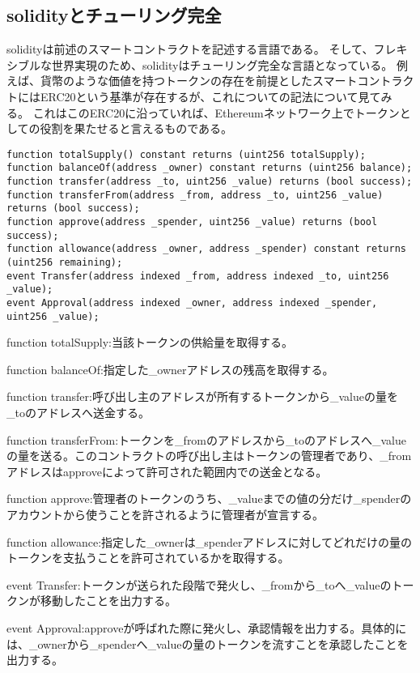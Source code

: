 \subsection{solidityとチューリング完全}
solidityは前述のスマートコントラクトを記述する言語である。
そして、フレキシブルな世界実現のため、solidityはチューリング完全な言語となっている。
例えば、貨幣のような価値を持つトークンの存在を前提としたスマートコントラクトにはERC20という基準が存在するが、これについての記法について見てみる。
これはこのERC20に沿っていれば、Ethereumネットワーク上でトークンとしての役割を果たせると言えるものである。
\begin{lstlisting}[caption=ERC20を満たすために必要な関数とイベントの宣言文,label=ERC20-criteria]
function totalSupply() constant returns (uint256 totalSupply);
function balanceOf(address _owner) constant returns (uint256 balance);
function transfer(address _to, uint256 _value) returns (bool success);
function transferFrom(address _from, address _to, uint256 _value) returns (bool success);
function approve(address _spender, uint256 _value) returns (bool success);
function allowance(address _owner, address _spender) constant returns (uint256 remaining);
event Transfer(address indexed _from, address indexed _to, uint256 _value);
event Approval(address indexed _owner, address indexed _spender, uint256 _value);
\end{lstlisting}
\begin{list}{}{}
\item function totalSupply:当該トークンの供給量を取得する。
\item function balanceOf:指定した\_ownerアドレスの残高を取得する。
\item function transfer:呼び出し主のアドレスが所有するトークンから\_valueの量を\_toのアドレスへ送金する。
\item function transferFrom:トークンを\_fromのアドレスから\_toのアドレスへ\_valueの量を送る。このコントラクトの呼び出し主はトークンの管理者であり、\_fromアドレスはapproveによって許可された範囲内での送金となる。
\item function approve:管理者のトークンのうち、\_valueまでの値の分だけ\_spenderのアカウントから使うことを許されるように管理者が宣言する。
\item function allowance:指定した\_ownerは\_spenderアドレスに対してどれだけの量のトークンを支払うことを許可されているかを取得する。
\item event Transfer:トークンが送られた段階で発火し、\_fromから\_toへ\_valueのトークンが移動したことを出力する。
\item event Approval:approveが呼ばれた際に発火し、承認情報を出力する。具体的には、\_ownerから\_spenderへ\_valueの量のトークンを流すことを承認したことを出力する。
\end{list}
